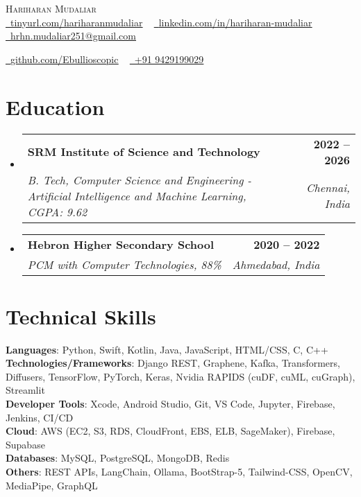 \documentclass[letterpaper,11pt]{article}
\makeatletter
\newcommand{\resumeSubheading}[4]{
  \vspace{-2pt}\item
    \begin{tabular*}{1.0\textwidth}[t]{l@{\extracolsep{\fill}}r}
      \textbf{#1} & \textbf{\small #2} \\
      \textit{\small#3} & \textit{\small #4} \\
    \end{tabular*}\vspace{-7pt}
}
\newcommand{\resumeSubHeadingListStart}{\begin{itemize}[leftmargin=0.0in, label={}]}
\newcommand{\resumeSubHeadingListEnd}{\end{itemize}}
\makeatother
\begin{document}
\begin{center}
    {\Huge \scshape Hariharan Mudaliar} \\ \vspace{1pt}
    \href{https://tinyurl.com/hariharanmudaliar}{\raisebox{-0.2\height}\faLink\ \underline{tinyurl.com/hariharanmudaliar}} ~
    \href{https://linkedin.com/in/hariharan-mudaliar}{\raisebox{-0.2\height}\faLinkedin\ \underline{linkedin.com/in/hariharan-mudaliar}} ~
    \href{mailto:hrhn.mudaliar251@gmail.com}{\raisebox{-0.2\height}\faEnvelope\ \underline{hrhn.mudaliar251@gmail.com}} ~
    
    \href{https://github.com/Ebullioscopic}{\raisebox{-0.2\height}\faGithub\ \underline{github.com/Ebullioscopic}} ~
    \href{tel:+919429199029}{\raisebox{-0.2\height}\faPhone\ +91 9429199029}
\end{center}

\section{Education}
\resumeSubHeadingListStart
  \resumeSubheading
    {SRM Institute of Science and Technology}{2022 -- 2026}
    {B. Tech, Computer Science and Engineering - Artificial Intelligence and Machine Learning, CGPA: 9.62}{Chennai, India}
\resumeSubHeadingListEnd

\resumeSubHeadingListStart
  \resumeSubheading
    {Hebron Higher Secondary School}{2020 -- 2022}
    {PCM with Computer Technologies, 88\%}{Ahmedabad, India}
\resumeSubHeadingListEnd


\section{Technical Skills}
 \begin{itemize}[leftmargin=0.15in, label={}]
    \small{\item{
     \textbf{Languages}{: Python, Swift, Kotlin, Java, JavaScript, HTML/CSS, C, C++} \\
     \textbf{Technologies/Frameworks}{: Django REST, Graphene, Kafka, Transformers, Diffusers, TensorFlow, PyTorch, Keras, Nvidia RAPIDS (cuDF, cuML, cuGraph), Streamlit} \\
     \textbf{Developer Tools}{: Xcode, Android Studio, Git, VS Code, Jupyter, Firebase, Jenkins, CI/CD} \\
     \textbf{Cloud}{: AWS (EC2, S3, RDS, CloudFront, EBS, ELB, SageMaker), Firebase, Supabase} \\
     \textbf{Databases}{: MySQL, PostgreSQL, MongoDB, Redis} \\
     \textbf{Others}{: REST APIs, LangChain, Ollama, BootStrap-5, Tailwind-CSS, OpenCV, MediaPipe, GraphQL} \\
    }}
 \end{itemize}
\end{document}
